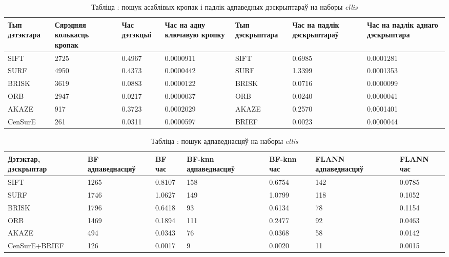 \begin{table}[h]
  \centering
  \begin{footnotesize}
  \begin{tabular}{ | p{16mm} | p{17mm} | p{19mm} | p{22mm} | p{20mm} | p{22mm} | p{22mm} | }
    \hline
    Тып дэтэктара & Сярэдняя колькасць кропак & Час дэтэкцыі & Час на адну ключавую кропку & Тып дэскрыптара & Час на падлік дэскрыптараў & Час на падлік аднаго дэскрыптара \\ \hline
    SIFT & 2725 & 0.4967 & 0.0000911 & SIFT & 0.6985 & 0.0001281 \\ \hline
    SURF & 4950 & 0.4373 & 0.0000442 & SURF & 1.3399 & 0.0001353 \\ \hline
    BRISK & 3619 & 0.0883 & 0.0000122 & BRISK & 0.0716 & 0.0000099 \\ \hline
    ORB & 2947 & 0.0217 & 0.0000037 & ORB & 0.0240 & 0.0000041 \\ \hline
    AKAZE & 917 & 0.3723 & 0.0002029 & AKAZE & 0.2570 & 0.0001401 \\ \hline
    CenSurE & 261 & 0.0311 & 0.0000597 & BRIEF & 0.0023 & 0.0000044 \\ \hline
  \end{tabular}
  \end{footnotesize}
\captionsetup{labelformat=empty,justification=centering}
\caption{Табліца : пошук асаблівых кропак і падлік адпаведных дэскрыптараў на наборы \textit{ellis}}
\label{table:ellis-kp}
\end{table}

\begin{table}[h]
  \centering
  \begin{footnotesize}
  \begin{tabular}{ | p{20mm} | p{22mm} | p{15mm} | p{22mm} | p{15mm} | p{22mm} | p{15mm} | }
    \hline
    Дэтэктар, дэскрыптар & BF адпаведнасцяў & BF час & BF-knn адпаведнасцяў & BF-knn час & FLANN адпаведнасцяў & FLANN час \\ \hline
    SIFT & 1265 & 0.8107 & 158 & 0.6754 & 142 & 0.0785 \\ \hline
    SURF & 1746 & 1.0627 & 149 & 1.0799 & 118 & 0.1052 \\ \hline
    BRISK & 1796 & 0.6418 & 93 & 0.6134 & 78 & 0.1154 \\ \hline
    ORB & 1469 & 0.1894 & 111 & 0.2477 & 92 & 0.0463 \\ \hline
    AKAZE & 494 & 0.0343 & 76 & 0.0368 & 58 & 0.0142 \\ \hline
    CenSurE+\newline BRIEF & 126 & 0.0017 & 9 & 0.0020 & 11 & 0.0015 \\ \hline
  \end{tabular}
  \end{footnotesize}
\captionsetup{labelformat=empty,justification=centering}
\caption{Табліца : пошук адпаведнасцяў на наборы \textit{ellis}}
\label{table:ellis-matching}
\end{table}

